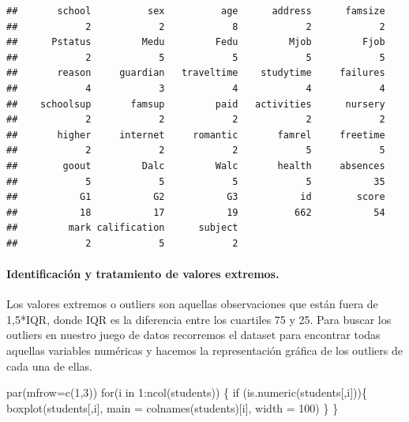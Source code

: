 \documentclass[]{article}
\newenvironment{Shaded}{\begin{snugshade}}{\end{snugshade}}
\newcommand{\ControlFlowTok}[1]{\textcolor[rgb]{0.94,0.87,0.69}{#1}}
\newcommand{\DataTypeTok}[1]{\textcolor[rgb]{0.87,0.87,0.75}{#1}}
\newcommand{\DecValTok}[1]{\textcolor[rgb]{0.86,0.86,0.80}{#1}}
\newcommand{\KeywordTok}[1]{\textcolor[rgb]{0.94,0.87,0.69}{#1}}
\newcommand{\NormalTok}[1]{\textcolor[rgb]{0.80,0.80,0.80}{#1}}
\newcommand{\OperatorTok}[1]{\textcolor[rgb]{0.94,0.94,0.82}{#1}}
\let\oldparagraph\paragraph
\renewcommand{\paragraph}[1]{\oldparagraph{#1}\mbox{}}
\begin{document}
\begin{verbatim}
##       school          sex          age      address      famsize 
##            2            2            8            2            2 
##      Pstatus         Medu         Fedu         Mjob         Fjob 
##            2            5            5            5            5 
##       reason     guardian   traveltime    studytime     failures 
##            4            3            4            4            4 
##    schoolsup       famsup         paid   activities      nursery 
##            2            2            2            2            2 
##       higher     internet     romantic       famrel     freetime 
##            2            2            2            5            5 
##        goout         Dalc         Walc       health     absences 
##            5            5            5            5           35 
##           G1           G2           G3           id        score 
##           18           17           19          662           54 
##         mark calification      subject 
##            2            5            2
\end{verbatim}

\hypertarget{identificacion-y-tratamiento-de-valores-extremos.}{%
\paragraph{Identificación y tratamiento de valores
extremos.}\label{identificacion-y-tratamiento-de-valores-extremos.}}

Los valores extremos o outliers son aquellas observaciones que están
fuera de 1,5*IQR, donde IQR es la diferencia entre los cuartiles 75 y
25. Para buscar los outliers en nuestro juego de datos recorremos el
dataset para encontrar todas aquellas variables numéricas y hacemos la
representación gráfica de los outliers de cada una de ellas.

\begin{Shaded}
\begin{Highlighting}[]
\KeywordTok{par}\NormalTok{(}\DataTypeTok{mfrow=}\KeywordTok{c}\NormalTok{(}\DecValTok{1}\NormalTok{,}\DecValTok{3}\NormalTok{))}
\ControlFlowTok{for}\NormalTok{(i }\ControlFlowTok{in} \DecValTok{1}\OperatorTok{:}\KeywordTok{ncol}\NormalTok{(students)) \{}
  \ControlFlowTok{if}\NormalTok{ (}\KeywordTok{is.numeric}\NormalTok{(students[,i]))\{}
    \KeywordTok{boxplot}\NormalTok{(students[,i], }\DataTypeTok{main =} \KeywordTok{colnames}\NormalTok{(students)[i], }\DataTypeTok{width =} \DecValTok{100}\NormalTok{)}
\NormalTok{  \}}
\NormalTok{\}}
\end{Highlighting}
\end{Shaded}
\end{document}
